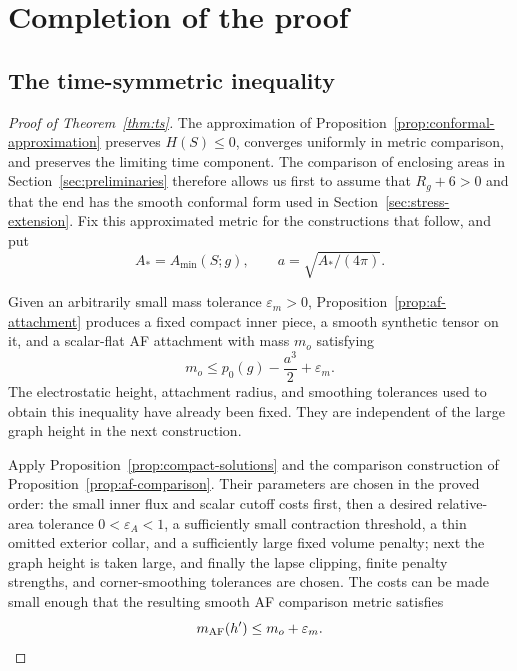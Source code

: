 \section{Completion of the proof}
\label{sec:completion}

\subsection{The time-symmetric inequality}

\begin{proof}[Proof of Theorem~\ref{thm:ts}]
The approximation of Proposition~\ref{prop:conformal-approximation}
preserves $H(S)\le0$, converges uniformly in metric comparison, and
preserves the limiting time component. The comparison of enclosing
areas in Section~\ref{sec:preliminaries} therefore allows us first to
assume that $R_g+6>0$ and that the end has the smooth conformal form
used in Section~\ref{sec:stress-extension}. Fix this approximated
metric for the constructions that follow, and put
\[
 A_*=A_{\min}(S;g),\qquad a=\sqrt{A_*/(4\pi)}.
\]

Given an arbitrarily small mass tolerance $\varepsilon_m>0$,
Proposition~\ref{prop:af-attachment} produces a fixed compact inner
piece, a smooth synthetic tensor on it, and a scalar-flat AF
attachment with mass $m_o$ satisfying
\begin{equation}\label{eq:completion-attachment-budget}
 m_o\le p_0(g)-\frac{a^3}{2}+\varepsilon_m.
\end{equation}
The electrostatic height, attachment radius, and smoothing tolerances
used to obtain this inequality have already been fixed. They are
independent of the large graph height in the next construction.

Apply Proposition~\ref{prop:compact-solutions} and the comparison
construction of Proposition~\ref{prop:af-comparison}. Their parameters
are chosen in the proved order: the small inner flux and scalar
cutoff costs first, then a desired relative-area tolerance
$0<\varepsilon_A<1$, a sufficiently small contraction threshold,
a thin omitted exterior collar, and a sufficiently large fixed
volume penalty; next the graph height is taken large, and finally
the lapse clipping, finite penalty strengths, and corner-smoothing
tolerances are chosen. The costs can be made small enough that the
resulting smooth AF comparison metric satisfies
\begin{equation}\label{eq:completion-comparison-budget}
 m_{\mathrm{AF}}(h')\le m_o+\varepsilon_m.
\end{equation}


\end{proof}

